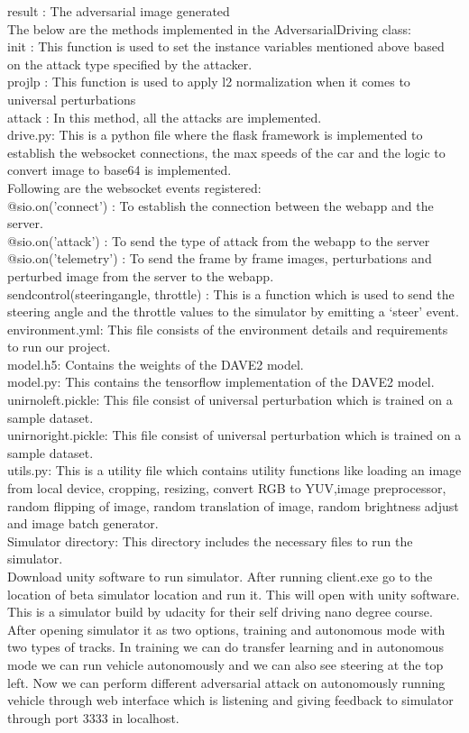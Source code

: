 \documentclass[ 12pt,a4paper,twocolumn,fleqn]{article}
\begin{document}
result : The adversarial image generated\\
The below are the methods implemented in the AdversarialDriving class:\\
init : This function is used to set the instance variables mentioned above based on the attack type specified by the attacker.\\
projlp : This function is used to apply l2 normalization when it comes to universal perturbations\\
attack : In this method, all the attacks are implemented.\\
drive.py: 
This is a python file where the flask framework is implemented to establish the websocket connections, the max speeds of the car and the logic to convert image to base64 is implemented.\\
Following are the websocket events registered:\\
@sio.on('connect') : To establish the connection between the webapp and the server.\\
@sio.on('attack') : To send the type of attack from the webapp to the server\\
@sio.on('telemetry') : To send the frame by frame images, perturbations and perturbed image from the server to the webapp.\\
sendcontrol(steeringangle, throttle) : This is a function which is used to send the steering angle and the throttle values to the simulator by emitting a ‘steer’ event.\\
environment.yml:
This file consists of the environment details and requirements to run our project.\\
model.h5:
Contains the weights of the DAVE2 model.\\
model.py:
This contains the tensorflow implementation of the DAVE2 model.\\
unirnoleft.pickle:
This file consist of universal perturbation which is trained on a sample dataset.\\
unirnoright.pickle:
This file consist of universal perturbation which is trained on a sample dataset. \\
utils.py:
This is a utility file which contains utility functions like loading an image from local device, cropping, resizing, convert RGB to YUV,image preprocessor, random flipping of image, random translation of image, random brightness adjust and image batch generator.\\

Simulator directory:
This directory includes the necessary files to run the simulator.\\
Download unity software to run simulator. After running client.exe go to the location of beta simulator location and run it. This will open with unity software. This is a simulator build by udacity for their self driving nano degree course. After opening simulator it as two options, training and autonomous mode with two types of tracks. In training we can do transfer learning and in autonomous mode we can run vehicle  autonomously and we can also see steering at the top left. Now we can perform different adversarial attack on autonomously running vehicle through web interface which is listening and giving feedback  to simulator through port 3333 in localhost. \\
\newpage
\end{document}
